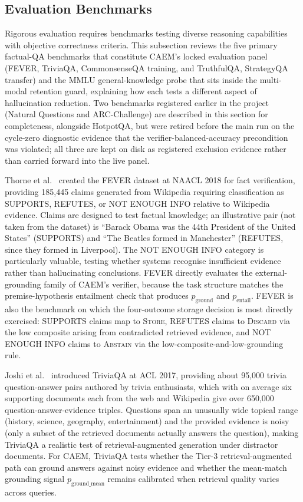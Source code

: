 \subsection{Evaluation Benchmarks}

Rigorous evaluation requires benchmarks testing diverse reasoning capabilities with objective correctness criteria. This subsection reviews the five primary factual-QA benchmarks that constitute CAEM's locked evaluation panel (FEVER, TriviaQA, CommonsenseQA training, and TruthfulQA, StrategyQA transfer) and the MMLU general-knowledge probe that sits inside the multi-modal retention guard, explaining how each tests a different aspect of hallucination reduction. Two benchmarks registered earlier in the project (Natural Questions and ARC-Challenge) are described in this section for completeness, alongside HotpotQA, but were retired before the main run on the cycle-zero diagnostic evidence that the verifier-balanced-accuracy precondition was violated; all three are kept on disk as registered exclusion evidence rather than carried forward into the live panel.

Thorne et al.~\cite{thorne-etal-2018-fever} created the FEVER dataset at NAACL 2018 for fact verification, providing 185{,}445 claims generated from Wikipedia requiring classification as SUPPORTS, REFUTES, or NOT ENOUGH INFO relative to Wikipedia evidence. Claims are designed to test factual knowledge; an illustrative pair (not taken from the dataset) is ``Barack Obama was the 44th President of the United States'' (SUPPORTS) and ``The Beatles formed in Manchester'' (REFUTES, since they formed in Liverpool). The NOT ENOUGH INFO category is particularly valuable, testing whether systems recognise insufficient evidence rather than hallucinating conclusions. FEVER directly evaluates the external-grounding family of CAEM's verifier, because the task structure matches the premise-hypothesis entailment check that produces $p_{\text{ground}}$ and $p_{\text{entail}}$. FEVER is also the benchmark on which the four-outcome storage decision is most directly exercised: SUPPORTS claims map to \textsc{Store}, REFUTES claims to \textsc{Discard} via the low composite arising from contradicted retrieved evidence, and NOT ENOUGH INFO claims to \textsc{Abstain} via the low-composite-and-low-grounding rule.

Joshi et al.~\cite{joshi-etal-2017-triviaqa} introduced TriviaQA at ACL 2017, providing about 95{,}000 trivia question-answer pairs authored by trivia enthusiasts, which with on average six supporting documents each from the web and Wikipedia give over 650{,}000 question-answer-evidence triples. Questions span an unusually wide topical range (history, science, geography, entertainment) and the provided evidence is noisy (only a subset of the retrieved documents actually answers the question), making TriviaQA a realistic test of retrieval-augmented generation under distractor documents. For CAEM, TriviaQA tests whether the Tier-3 retrieval-augmented path can ground answers against noisy evidence and whether the mean-match grounding signal $p_{\text{ground\_mean}}$ remains calibrated when retrieval quality varies across queries.

